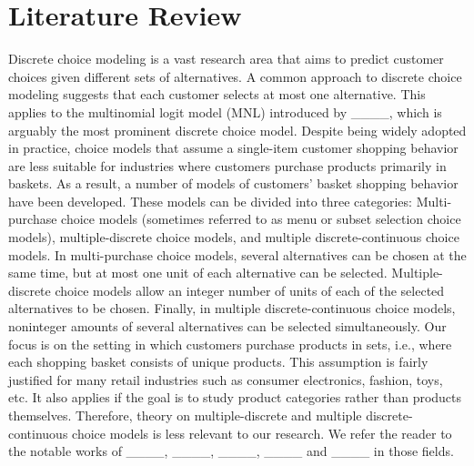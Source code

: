 \section{Literature Review}
\label{2sec:lit}

Discrete choice modeling is a vast research area that aims to predict customer choices given different sets of alternatives. A common approach to discrete choice modeling suggests that each customer selects at most one alternative. This applies to the multinomial logit model (MNL) introduced by ____, which is arguably the most prominent discrete choice model. Despite being widely adopted in practice, choice models that assume a single-item customer shopping behavior are less suitable for industries where customers purchase products primarily in baskets. As a result, a number of models of customers' basket shopping behavior have been developed.
These models can be divided into three categories: Multi-purchase choice models (sometimes referred to as menu or subset selection choice models), multiple-discrete choice models, and multiple discrete-continuous choice models. In multi-purchase choice models, several alternatives can be chosen at the same time, but at most one unit of each alternative can be selected.
Multiple-discrete choice models allow an integer number of units of each of the selected alternatives to be chosen. Finally, in multiple discrete-continuous choice models, noninteger amounts of several alternatives can be selected simultaneously. 
Our focus is on the setting in which customers purchase products in sets, i.e., where each shopping basket consists of unique products. This assumption is fairly justified for many retail industries such as consumer electronics, fashion, toys, etc. It also applies if the goal is to study product categories rather than products themselves. Therefore, theory on multiple-discrete and multiple discrete-continuous choice models is less relevant to our research. We refer the reader to the notable works of ____, ____, ____, ____ and ____ in those fields.



